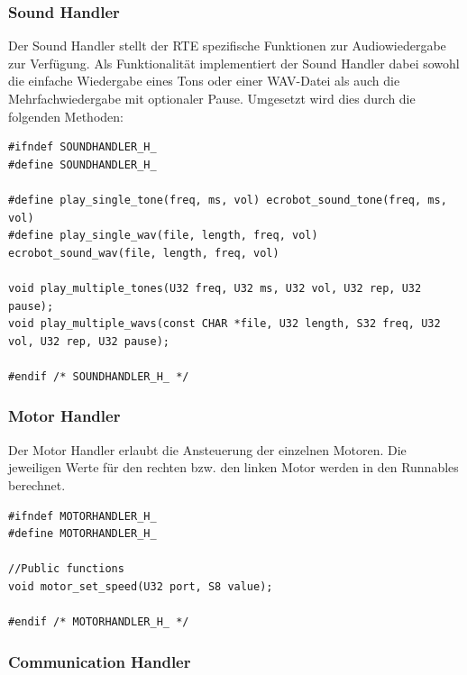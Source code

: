\subsubsection{Sound Handler}
Der Sound Handler stellt der RTE spezifische Funktionen zur Audiowiedergabe zur Verfügung.  
Als Funktionalität implementiert der Sound Handler dabei sowohl die einfache Wiedergabe eines Tons oder einer WAV-Datei als auch die Mehrfachwiedergabe mit optionaler Pause. Umgesetzt wird dies durch die folgenden Methoden:
\begin{lstlisting}[frame=single]  
#ifndef SOUNDHANDLER_H_
#define SOUNDHANDLER_H_

#define play_single_tone(freq, ms, vol) ecrobot_sound_tone(freq, ms, vol)
#define play_single_wav(file, length, freq, vol) ecrobot_sound_wav(file, length, freq, vol)

void play_multiple_tones(U32 freq, U32 ms, U32 vol, U32 rep, U32 pause);
void play_multiple_wavs(const CHAR *file, U32 length, S32 freq, U32 vol, U32 rep, U32 pause);

#endif /* SOUNDHANDLER_H_ */
\end{lstlisting}

\subsubsection{Motor Handler}
Der Motor Handler erlaubt die Ansteuerung der einzelnen Motoren. Die jeweiligen Werte für den rechten bzw. den linken Motor werden in den Runnables berechnet. 


\begin{lstlisting}[frame=single]  
#ifndef MOTORHANDLER_H_
#define MOTORHANDLER_H_

//Public functions
void motor_set_speed(U32 port, S8 value);

#endif /* MOTORHANDLER_H_ */
\end{lstlisting}



\subsubsection{Communication Handler}


